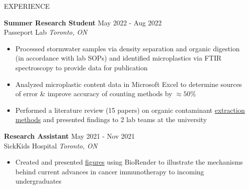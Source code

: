 \documentclass{resume}
\begin{document}
\begin{rSection}{EXPERIENCE}

\textbf{Summer Research Student} \hfill May 2022 - Aug 2022\\
Passeport Lab \hfill \textit{Toronto, ON}
\vspace{-0.2cm}
 \begin{itemize}
    \itemsep -8pt {} 
    \item Processed stormwater samples via density separation and organic digestion (in accordance with lab SOPs) and identified microplastics via FTIR spectroscopy to provide data for publication 
    \item Analyzed microplastic content data in Microsoft Excel to determine sources of error \& improve accuracy of counting methods by $\approx50\%$
    \item Performed a literature review (15 papers) on organic contaminant \href{https://drive.google.com/file/d/1tVPh5Zt4zLT8spiLfzJ4vu0XZSuMfOfu/view}{extraction methods} and presented findings to 2 lab teams at the university

 \end{itemize}
 
\textbf{Research Assistant} \hfill May 2021 - Nov 2021\\
SickKids Hospital \hfill \textit{Toronto, ON}
\vspace{-0.2cm}
 \begin{itemize}
    \itemsep -8pt {} 
     \item Created and presented \href{https://drive.google.com/file/d/1459llsxjfB4-UA4sHfnBQ7wem0znVUL5/view?usp=sharing}{figures} using BioRender to illustrate the mechanisms behind current advances in cancer immunotherapy to incoming undergraduates
 \end{itemize}


\end{rSection}
\end{document}

